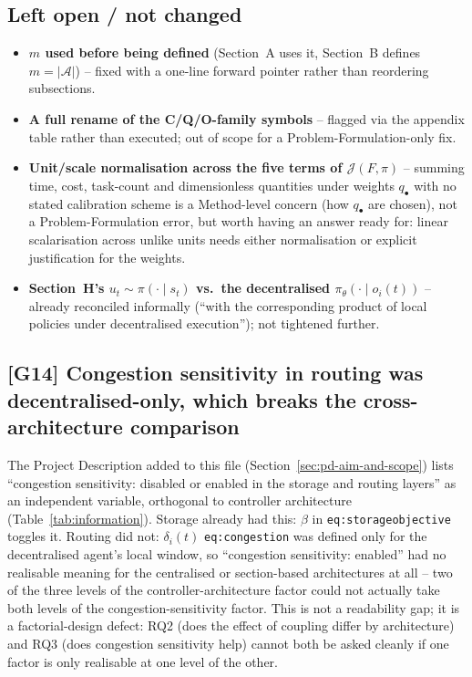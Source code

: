 \documentclass[11pt]{article}
\begin{document}
\subsection*{Left open / not changed}
\begin{itemize}
  \item \textbf{$m$ used before being defined} (Section~A uses it,
    Section~B defines $m=|\mathcal{A}|$) -- fixed with a one-line forward
    pointer rather than reordering subsections.
  \item \textbf{A full rename of the C/Q/O-family symbols} -- flagged via
    the appendix table rather than executed; out of scope for a
    Problem-Formulation-only fix.
  \item \textbf{Unit/scale normalisation across the five terms of
    $\mathcal{J}(F,\pi)$} -- summing time, cost, task-count and
    dimensionless quantities under weights $q_\bullet$ with no stated
    calibration scheme is a Method-level concern (how $q_\bullet$ are
    chosen), not a Problem-Formulation error, but worth having an answer
    ready for: linear scalarisation across unlike units needs either
    normalisation or explicit justification for the weights.
  \item \textbf{Section~H's $u_t\sim\pi(\cdot\mid s_t)$ vs.\ the
    decentralised $\pi_\theta(\cdot\mid o_i(t))$} -- already reconciled
    informally (``with the corresponding product of local policies under
    decentralised execution''); not tightened further.
\end{itemize}

\subsection{[G14] Congestion sensitivity in routing was decentralised-only, which breaks the cross-architecture comparison}
The Project Description added to this file (Section~\ref{sec:pd-aim-and-scope})
lists ``congestion sensitivity: disabled or enabled in the storage and routing
layers'' as an independent variable, orthogonal to controller architecture
(Table~\ref{tab:information}). Storage already had this: $\beta$ in
\texttt{eq:storageobjective} toggles it. Routing did not: $\delta_i(t)$
\texttt{eq:congestion} was defined only for the decentralised agent's local
window, so ``congestion sensitivity: enabled'' had no realisable meaning for
the centralised or section-based architectures at all -- two of the three
levels of the controller-architecture factor could not actually take both
levels of the congestion-sensitivity factor. This is not a readability gap;
it is a factorial-design defect: RQ2 (does the effect of coupling differ by
architecture) and RQ3 (does congestion sensitivity help) cannot both be asked
cleanly if one factor is only realisable at one level of the other.
\end{document}
